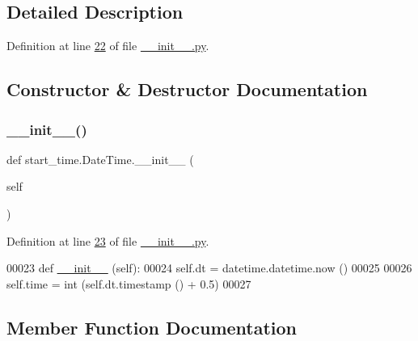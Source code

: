 \subsection{Detailed Description}


Definition at line \hyperlink{start__time_2____init_____8py_source_l00022}{22} of file \hyperlink{start__time_2____init_____8py_source}{\+\_\+\+\_\+init\+\_\+\+\_\+.\+py}.



\subsection{Constructor \& Destructor Documentation}
\mbox{\label{classstart__time_1_1_date_time_ac489a04fcc4ecce6b76bf69acc878cb6}} 
\subsubsection{\texorpdfstring{\+\_\+\+\_\+init\+\_\+\+\_\+()}{\_\_init\_\_()}}
{\footnotesize\ttfamily def start\+\_\+time.\+Date\+Time.\+\_\+\+\_\+init\+\_\+\+\_\+ (\begin{DoxyParamCaption}\item[{}]{self }\end{DoxyParamCaption})}



Definition at line \hyperlink{start__time_2____init_____8py_source_l00023}{23} of file \hyperlink{start__time_2____init_____8py_source}{\+\_\+\+\_\+init\+\_\+\+\_\+.\+py}.


\begin{DoxyCode}
00023     \textcolor{keyword}{def }\hyperlink{namespacestart__time_a9c9bd378729a13c96a22c8b079ea172c}{\_\_init\_\_} (self):
00024         self.dt = datetime.datetime.now ()
00025         
00026         self.time = int (self.dt.timestamp () + 0.5)
00027     
\end{DoxyCode}


\subsection{Member Function Documentation}
\mbox{\label{classstart__time_1_1_date_time_add3ddbc0a0bcd171e4a81b8d806d5801}} 
